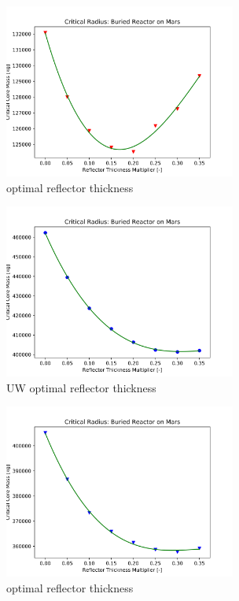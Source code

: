 \begin{figure}[h]
    \centering
    \includegraphics[width=3in]{../images/opt_refl_H2O_UO2.png}
\caption{\water \uox optimal reflector thickness}
\label{fig:uo2_h2o_refl}
\end{figure}

\begin{figure}[h]
    \centering
    \includegraphics[width=3in]{../images/opt_refl_CO2_UN.png}
\caption{\codiox UW optimal reflector thickness}
\label{fig:uw_co2_refl}
\end{figure}

\begin{figure}[h]
    \centering
    \includegraphics[width=3in]{../images/opt_refl_H2O_UN.png}
\caption{\water \uox optimal reflector thickness}
\label{fig:uw_h2o_refl}
\end{figure}

